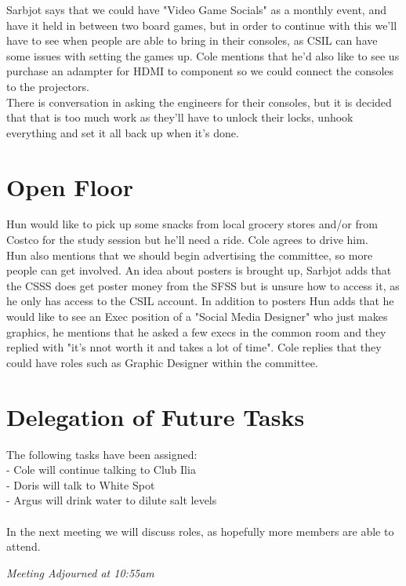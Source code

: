 \documentclass[12pt]{article}
\begin{document}
Sarbjot says that we could have "Video Game Socials" as a monthly event, and have it held in between two board games, but in order to continue with this we'll have to see when people are able to bring in their consoles, as CSIL can have some issues with setting the games up.  Cole mentions that he'd also like to see us purchase an adampter for HDMI to component so we could connect the consoles to the projectors. \\

There is conversation in asking the engineers for their consoles, but it is decided that that is too much work as they'll have to unlock their locks, unhook everything and set it all back up when it's done. 

\section{Open Floor} \label{sec: Open}
Hun would like to pick up some snacks from local grocery stores and/or from Costco for the study session but he'll need a ride. Cole agrees to drive him. \\ 

\noindent Hun also mentions that we should begin advertising the committee, so more people can get involved. An idea about posters is brought up, Sarbjot adds that the CSSS does get poster money from the SFSS but is unsure how to access it, as he only has access to the CSIL account.  In addition to posters Hun adds that he would like to see an Exec position of a "Social Media Designer" who just makes graphics, he mentions that he asked a few execs in the common room and they replied with "it's nnot worth it and takes a lot of time". Cole replies that they could have roles such as Graphic Designer within the committee.

\section{Delegation of Future Tasks} \label{sec: Future}
\noindent The following tasks have been assigned: \\
- Cole will continue talking to Club Ilia\\
- Doris will talk to White Spot  \\
- Argus will drink water to dilute salt levels \\  \\ 
In the next meeting we will discuss roles, as hopefully more members are able to attend.

\begin{center}
\em{Meeting Adjourned at 10:55am}
\end{center}
\end{document}
